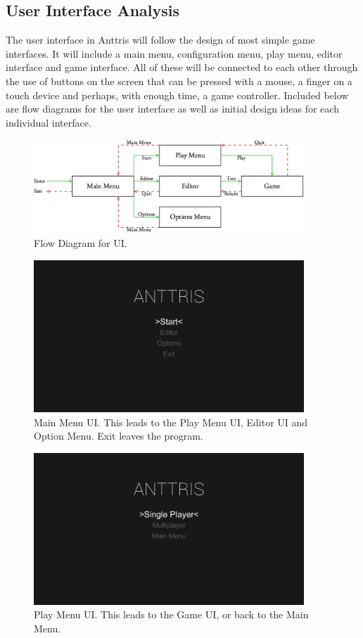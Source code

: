 \documentclass[12pt]{article}
\begin{document}
\subsection{User Interface Analysis}\label{UI-analysis-CA}
The user interface in Anttris will follow the design of most simple game interfaces. It will include a main menu, configuration menu, play menu, editor interface and game interface. All of these will be connected to each other through the use of buttons on the screen that can be pressed with a mouse, a finger on a touch device and perhaps, with enough time, a game controller. Included below are flow diagrams for the user interface as well as initial design ideas for each individual interface.\\

    \begin{figure}[H]
        \centering
        \includegraphics[width=4in]{UIFlow.png}
        \caption{Flow Diagram for UI.}
    \end{figure}
    \begin{figure}[H]
        \centering
        \includegraphics[width=4in]{MainMenu.png}
        \caption{Main Menu UI. This leads to the Play Menu UI, Editor UI and Option Menu. Exit leaves the program.}
    \end{figure}
    \begin{figure}[H]
        \centering
        \includegraphics[width=4in]{PlayMenu.png}
        \caption{Play Menu UI. This leads to the Game UI, or back to the Main Menu.}
    \end{figure}
\end{document}

